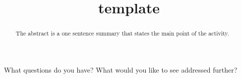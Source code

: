 \documentclass{ximera}
\title{template}
\begin{document}
\begin{abstract}
  The abstract is a one sentence summary that states the main point of the activity.
\end{abstract}

\maketitle

What questions do you have?  What would you like to see addressed further?
\begin{free-response}
\end{free-response}
\end{document}

